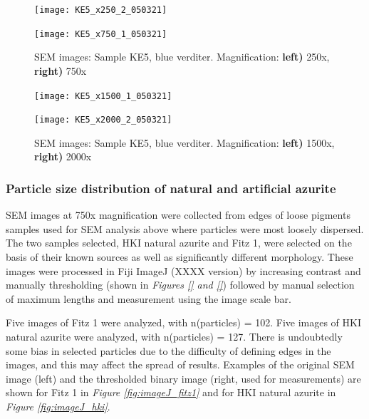 \begin{figure}[H]
\centering
\begin{minipage}{.45\textwidth}
  \centering
  \texttt{[image: KE5\_x250\_2\_050321]}
\end{minipage}
\begin{minipage}{.45\textwidth}
  \centering
  \texttt{[image: KE5\_x750\_1\_050321]}
\end{minipage}
\caption[SEM images: Sample KE5, blue verditer]{SEM images: Sample KE5, blue verditer. Magnification: \textbf{left)} 250x, \textbf{right)} 750x}
\label{fig:KE5_sem_1}
\end{figure}

\begin{figure}[H]
\centering
\begin{minipage}{.45\textwidth}
  \centering
  \texttt{[image: KE5\_x1500\_1\_050321]}
\end{minipage}
\begin{minipage}{.45\textwidth}
  \centering
  \texttt{[image: KE5\_x2000\_2\_050321]}
\end{minipage}
\caption[SEM images: Sample KE5, blue verditer]{SEM images: Sample KE5, blue verditer. Magnification: \textbf{left)} 1500x, \textbf{right)} 2000x}
\label{fig:KE5_sem_2}
\end{figure}

\subsubsection[Particle size distribution of natural and artificial azurite]{Particle size distribution of natural and artificial azurite}
\label{subsubsection3.1.1.1}

SEM images at 750x magnification were collected from edges of loose pigments samples used for SEM analysis above where particles were most loosely dispersed. The two samples selected, HKI natural azurite and Fitz 1, were selected on the basis of their known sources as well as significantly different morphology. These images were processed in Fiji ImageJ (XXXX version) by increasing contrast and manually thresholding (shown in \textit{Figures \ref{} and \ref{}}) followed by manual selection of maximum lengths and measurement using the image scale bar. 

Five images of Fitz 1 were analyzed, with n(particles) = 102. Five images of HKI natural azurite were analyzed, with n(particles) = 127. There is undoubtedly some bias in selected particles due to the difficulty of defining edges in the images, and this may affect the spread of results. Examples of the original SEM image (left) and the thresholded binary image (right, used for measurements) are shown for Fitz 1 in \textit{Figure \ref{fig:imageJ_fitz1}} and for HKI natural azurite in \textit{Figure \ref{fig:imageJ_hki}}. 

